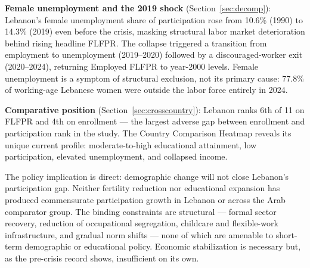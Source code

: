 \documentclass[12pt,a4paper]{article}
\begin{document}
\textbf{Female unemployment and the 2019 shock} (Section~\ref{sec:decomp}): Lebanon's female unemployment share of participation rose from 10.6\% (1990) to 14.3\% (2019) even before the crisis, masking structural labor market deterioration behind rising headline FLFPR. The collapse triggered a transition from employment to unemployment (2019--2020) followed by a discouraged-worker exit (2020--2024), returning Employed FLFPR to year-2000 levels. Female unemployment is a symptom of structural exclusion, not its primary cause: 77.8\% of working-age Lebanese women were outside the labor force entirely in 2024.

\textbf{Comparative position} (Section~\ref{sec:crosscountry}): Lebanon ranks 6th of 11 on FLFPR and 4th on enrollment --- the largest adverse gap between enrollment and participation rank in the study. The Country Comparison Heatmap reveals its unique current profile: moderate-to-high educational attainment, low participation, elevated unemployment, and collapsed income.

The policy implication is direct: demographic change will not close Lebanon's participation gap. Neither fertility reduction nor educational expansion has produced commensurate participation growth in Lebanon or across the Arab comparator group. The binding constraints are structural --- formal sector recovery, reduction of occupational segregation, childcare and flexible-work infrastructure, and gradual norm shifts --- none of which are amenable to short-term demographic or educational policy. Economic stabilization is necessary but, as the pre-crisis record shows, insufficient on its own.
\end{document}
